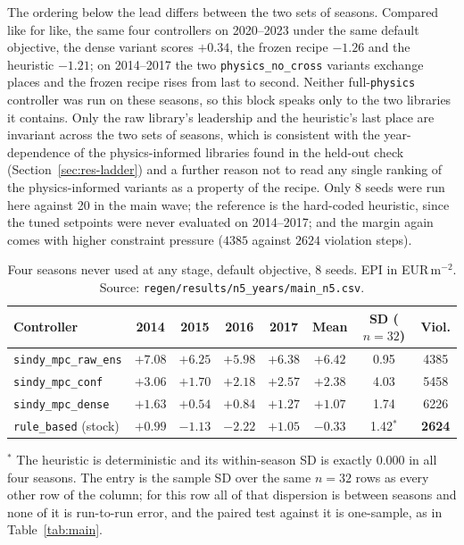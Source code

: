 The ordering below the lead differs between the two sets of seasons. Compared like for
like, the same four controllers on 2020--2023 under the same default objective, the dense variant
scores $+0.34$, the frozen recipe $-1.26$ and the heuristic $-1.21$; on 2014--2017 the two
\texttt{physics\_no\_cross} variants exchange places and the frozen recipe rises from last
to second. Neither full-\texttt{physics} controller was run on these seasons, so this block
speaks only to the two libraries it contains. Only the
raw library's leadership and the heuristic's last place are invariant across the two sets
of seasons, which is consistent with the year-dependence of the physics-informed libraries
found in the held-out check (Section~\ref{sec:res-ladder}) and a further reason not to read
any single ranking of the physics-informed variants as a property of the recipe. Only 8
seeds were run here against 20 in the main wave; the reference is the hard-coded heuristic,
since the tuned setpoints were never evaluated on 2014--2017; and the margin again comes
with higher constraint pressure ($4385$ against $2624$ violation steps).

\begin{table}[t]
\centering
\caption{Four seasons never used at any stage, default objective, 8 seeds. EPI in
EUR\,m$^{-2}$. Source: \texttt{regen/results/n5\_years/main\_n5.csv}.}
\label{tab:unseen}
\small
\begin{tabular}{@{}lccccccc@{}}
\toprule
Controller & 2014 & 2015 & 2016 & 2017 & Mean & SD ($n=32$) & Viol. \\
\midrule
\texttt{sindy\_mpc\_raw\_ens} & $+7.08$ & $+6.25$ & $+5.98$ & $+6.38$ & $\mathbf{+6.42}$ & 0.95 & 4385 \\
\texttt{sindy\_mpc\_conf}     & $+3.06$ & $+1.70$ & $+2.18$ & $+2.57$ & $+2.38$ & 4.03 & 5458 \\
\texttt{sindy\_mpc\_dense}    & $+1.63$ & $+0.54$ & $+0.84$ & $+1.27$ & $+1.07$ & 1.74 & 6226 \\
\texttt{rule\_based} (stock)  & $+0.99$ & $-1.13$ & $-2.22$ & $+1.05$ & $-0.33$ & 1.42$^{*}$ & \textbf{2624} \\
\bottomrule
\end{tabular}

\vspace{2pt}
\begin{minipage}{\linewidth}\footnotesize
$^{*}$ The heuristic is deterministic and its within-season SD is exactly $0.000$ in all
four seasons. The entry is the sample SD over the same $n=32$ rows as every other row of
the column; for this row all of that dispersion is between seasons and none of it is
run-to-run error, and the paired test against it is one-sample, as in
Table~\ref{tab:main}.
\end{minipage}
\end{table}

